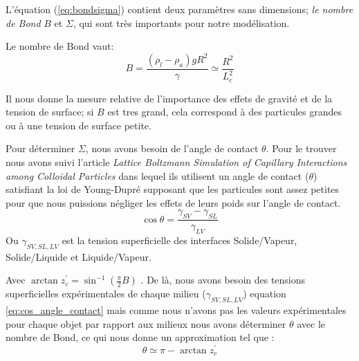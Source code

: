 
        L'équation (\ref{eq:bondsigma}) contient deux paramètres sans dimensions; \textit{le nombre de Bond} $B$ et $\Sigma$, qui sont très importants pour notre modélisation.

        Le nombre de Bond vaut:
        \begin{equation}
            B = \frac{(\rho_l-\rho_{a})gR^2}{\gamma} \simeq \frac{R^2}{L_c^2}
        \end{equation}

        Il nous donne la mesure relative de l'importance des effets de gravité et de la tension de surface; si $B$ est tres grand, cela correspond à des particules grandes ou à une tension de surface petite. 

        Pour déterminer $\Sigma$, nous avons besoin de l'angle de contact $\theta$. Pour le trouver nous avons suivi l'article \textit{Lattice Boltzmann Simulation of Capillary Interactions among Colloidal Particles}\cite{lattice_boltzmann_caplilary_interaction} dans lequel ils utilisent un angle de contact ($\theta$) satisfiant la loi de Young-Dupré supposant que les particules sont assez petites pour que nous puissions négliger les effets de leurs poids sur l'angle de contact. %
        \begin{equation}
            \cos \theta = \frac{\gamma_{SV}-\gamma_{SL}}{\gamma_{LV}}
            \label{eq:cos_angle_contact}
        \end{equation}
        Ou $\gamma_{SV,SL,LV}$ est la tension superficielle des interfaces Solide/Vapeur, Solide/Liquide et Liquide/Vapeur.
        
        Avec $\arctan z_c^{'} = \sin^{-1}\left(\frac{\pi}{2}B\right)$ \cite{lattice_boltzmann_caplilary_interaction}. De là, nous avons besoin des tensions superficielles expérimentales de chaque milieu ($\gamma_{SV, SL, LV}$) equation \ref{eq:cos_angle_contact} mais comme nous n'avons pas les valeurs expérimentales pour chaque objet par rapport aux milieux nous avons déterminer $\theta$ avec le nombre de Bond, ce qui nous donne un approximation tel que :
        \begin{equation}
            \theta \simeq \pi - \arctan z_c^{'}
        \end{equation}
        
